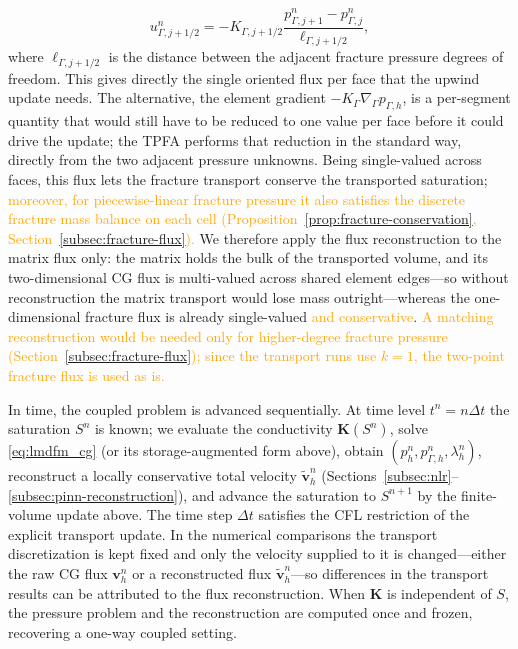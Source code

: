 \documentclass[a4paper,fleqn]{cas-sc}
\newcommand{\Kmat}{\mathbf{K}}
\newcommand{\vflux}{\mathbf{v}}
\begin{document}
\[
  u_{\Gamma,j+1/2}^{n}
  =
  -K_{\Gamma,j+1/2}
  \frac{p_{\Gamma,j+1}^n-p_{\Gamma,j}^n}{\ell_{\Gamma,j+1/2}},
\]
where \(\ell_{\Gamma,j+1/2}\) is the distance between the adjacent fracture
pressure degrees of freedom. This gives directly the single oriented flux per face
that the upwind update needs. The alternative, the element gradient
\(-K_\Gamma\nabla_\Gamma p_{\Gamma,h}\), is a per-segment quantity that would still
have to be reduced to one value per face before it could drive the update; the TPFA
performs that reduction in the standard way, directly from the two adjacent
pressure unknowns. Being
single-valued across faces, this flux lets the fracture transport conserve the
transported saturation; \textcolor{orange}{moreover, for piecewise-linear fracture
pressure it also satisfies the discrete fracture mass balance on each cell
(Proposition~\ref{prop:fracture-conservation}, Section~\ref{subsec:fracture-flux}).}
We therefore apply the flux reconstruction to the matrix flux
only: the matrix holds the bulk of the transported volume, and its two-dimensional
CG flux is multi-valued across shared element edges---so without reconstruction the
matrix transport would lose mass outright---whereas the one-dimensional fracture
flux is already single-valued \textcolor{orange}{and conservative}.
\textcolor{orange}{A matching reconstruction would be needed only for higher-degree
fracture pressure (Section~\ref{subsec:fracture-flux}); since the transport runs use
\(k=1\), the two-point fracture flux is used as is.}

In time, the coupled problem is advanced sequentially. At time level
\(t^n=n\Delta t\) the saturation \(S^n\) is known; we evaluate the conductivity
\(\Kmat(S^n)\), solve \eqref{eq:lmdfm_cg} (or its storage-augmented form above),
obtain \((p_h^n,p_{\Gamma,h}^n,\lambda_h^n)\), reconstruct a locally conservative
total velocity \(\widetilde{\vflux}_h^n\)
(Sections~\ref{subsec:nlr}--\ref{subsec:pinn-reconstruction}), and advance the
saturation to \(S^{n+1}\) by the finite-volume update above. The time step
\(\Delta t\) satisfies the CFL restriction of the explicit transport update. In the
numerical comparisons the transport discretization is kept fixed and only the
velocity supplied to it is changed---either the raw CG flux \(\vflux_h^n\) or a
reconstructed flux \(\widetilde{\vflux}_h^n\)---so differences in the transport
results can be attributed to the flux reconstruction. When \(\Kmat\) is independent
of \(S\), the pressure problem and the reconstruction are computed once and frozen,
recovering a one-way coupled setting.
\end{document}
